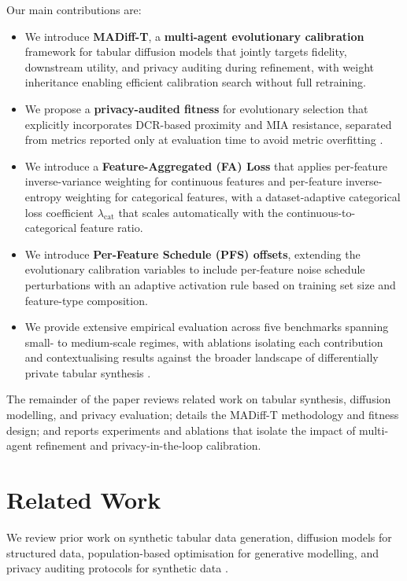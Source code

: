 \documentclass[preprint,12pt]{elsarticle}
\begin{document}
Our main contributions are:
\begin{itemize}
    \item We introduce \textbf{MADiff-T}, a \textbf{multi-agent evolutionary calibration} framework for tabular diffusion models that jointly targets fidelity, downstream utility, and privacy auditing during refinement, with weight inheritance enabling efficient calibration search without full retraining.
    \item We propose a \textbf{privacy-audited fitness} for evolutionary selection that explicitly incorporates DCR-based proximity and MIA resistance, separated from metrics reported only at evaluation time to avoid metric overfitting \cite{Hernandez2025}.
    \item We introduce a \textbf{Feature-Aggregated (FA) Loss} that applies per-feature inverse-variance weighting for continuous features and per-feature inverse-entropy weighting for categorical features, with a dataset-adaptive categorical loss coefficient $\lambda_{\text{cat}}$ that scales automatically with the continuous-to-categorical feature ratio.
    \item We introduce \textbf{Per-Feature Schedule (PFS) offsets}, extending the evolutionary calibration variables to include per-feature noise schedule perturbations with an adaptive activation rule based on training set size and feature-type composition.
   \item We provide extensive empirical evaluation across five benchmarks 
spanning small- to medium-scale regimes, with ablations isolating each 
contribution and contextualising results against the broader landscape 
of differentially private tabular synthesis 
\cite{chen2025benchmarking_dp_tabular_synthesis}.
\end{itemize}
The remainder of the paper reviews related work on tabular synthesis, diffusion modelling, and privacy evaluation; details the MADiff-T methodology and fitness design; and reports experiments and ablations that isolate the impact of multi-agent refinement and privacy-in-the-loop calibration.

\section{Related Work}\label{sec:related}
We review prior work on synthetic tabular data generation, diffusion models for structured data, population-based optimisation for generative modelling, and privacy auditing protocols for synthetic data \cite{cormode2025synthetic_tabular_kdd}.
\end{document}
